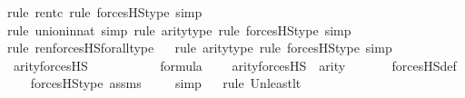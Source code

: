 \begin{isabellebody}
{\isacharparenleft}{\kern0pt}rule\ ren{\isacharunderscore}{\kern0pt}tc{\isacharcomma}{\kern0pt}\ rule\ forcesHS{\isacharprime}{\kern0pt}{\isacharunderscore}{\kern0pt}type{\isacharcomma}{\kern0pt}\ simp{\isacharparenright}{\kern0pt}\isanewline
\ \ \ \ \isamarkupfalse%
{\isacharparenleft}{\kern0pt}rule\ union{\isacharunderscore}{\kern0pt}in{\isacharunderscore}{\kern0pt}nat{\isacharcomma}{\kern0pt}\ simp{\isacharcomma}{\kern0pt}\ rule\ arity{\isacharunderscore}{\kern0pt}type{\isacharcomma}{\kern0pt}\ rule\ forcesHS{\isacharprime}{\kern0pt}{\isacharunderscore}{\kern0pt}type{\isacharcomma}{\kern0pt}\ simp{\isacharparenright}{\kern0pt}{\isacharplus}{\kern0pt}\isanewline
\ \ \isamarkupfalse%
{\isacharparenleft}{\kern0pt}rule\ ren{\isacharunderscore}{\kern0pt}forcesHS{\isacharunderscore}{\kern0pt}forall{\isacharunderscore}{\kern0pt}type{\isacharparenright}{\kern0pt}\isanewline
\ \ \isamarkupfalse%
{\isacharparenleft}{\kern0pt}rule\ arity{\isacharunderscore}{\kern0pt}type{\isacharcomma}{\kern0pt}\ rule\ forcesHS{\isacharprime}{\kern0pt}{\isacharunderscore}{\kern0pt}type{\isacharcomma}{\kern0pt}\ simp{\isacharparenright}{\kern0pt}\isanewline
\ \ \isamarkupfalse%
%
\endisatagproof
{\isafoldproof}%
%
\isadelimproof
\isanewline
%
\endisadelimproof
\isanewline
{}\isamarkupfalse%
\ arity{\isacharunderscore}{\kern0pt}forcesHS\ {\isacharcolon}{\kern0pt}\ \isanewline
\ \ \ {\isasymphi}\isanewline
\ \ \ {\isachardoublequoteopen}{\isasymphi}\ {\isasymin}\ formula{\isachardoublequoteclose}\ \isanewline
\ \ \ {\isachardoublequoteopen}arity{\isacharparenleft}{\kern0pt}forcesHS{\isacharparenleft}{\kern0pt}{\isasymphi}{\isacharparenright}{\kern0pt}{\isacharparenright}{\kern0pt}\ {\isasymle}\ arity{\isacharparenleft}{\kern0pt}{\isasymphi}{\isacharparenright}{\kern0pt}\ {\isacharhash}{\kern0pt}{\isacharplus}{\kern0pt}\ {}{\isachardoublequoteclose}\ \isanewline
%
\isadelimproof
\ \ %
\endisadelimproof
%
\isatagproof
{}\isamarkupfalse%
\ forcesHS{\isacharunderscore}{\kern0pt}def\ \isanewline
\ \ \isamarkupfalse%
\ forcesHS{\isacharprime}{\kern0pt}{\isacharunderscore}{\kern0pt}type\ assms\ \isanewline
\ \ \isamarkupfalse%
\ simp\isanewline
\ \ \isamarkupfalse%
{\isacharparenleft}{\kern0pt}rule\ Un{\isacharunderscore}{\kern0pt}least{\isacharunderscore}{\kern0pt}lt{\isacharparenright}{\kern0pt}{\isacharplus}{\kern0pt}\isanewline
\ \ \ \ \isamarkupfalse%

\end{isabellebody}
